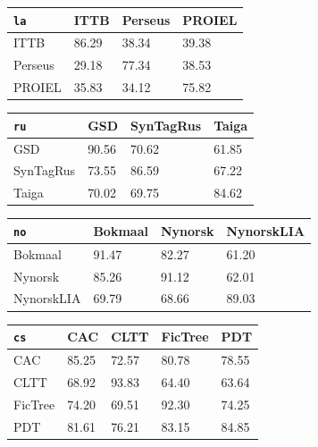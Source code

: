 \begin{table}[H]
\begin{tabular}{|l|l|l|l|}
    \hline
    \verb|la| & ITTB & Perseus & PROIEL \\
    \hline
    ITTB & 86.29 & 38.34 & 39.38 \\
    \hline
    Perseus & 29.18 & 77.34 & 38.53 \\
    \hline
    PROIEL & 35.83 & 34.12 & 75.82 \\
    \hline
    \end{tabular}
    \vspace{5mm}
    \newline
    \begin{tabular}{|l|l|l|l|}
    \hline
    \verb|ru| & GSD & SynTagRus & Taiga\\
    \hline
    GSD & 90.56 & 70.62 & 61.85 \\
    \hline
    SynTagRus & 73.55 & 86.59 & 67.22 \\
    \hline
    Taiga & 70.02 & 69.75 & 84.62 \\
    \hline
    \end{tabular}%
    \vspace{5mm}
    \newline
    \begin{tabular}{|l|l|l|l|}
    \hline
    \verb|no| & Bokmaal & Nynorsk & NynorskLIA \\
    \hline
    Bokmaal & 91.47 & 82.27 & 61.20 \\
    \hline
    Nynorsk & 85.26 & 91.12 & 62.01 \\
    \hline
    NynorskLIA & 69.79 & 68.66 & 89.03 \\
    \hline
    \end{tabular}%
    \vspace{5mm}
    \newline
    \begin{tabular}{|l|l|l|l|l|}
    \hline
    \verb|cs| & CAC & CLTT & FicTree & PDT \\
    \hline
    CAC & 85.25 & 72.57 & 80.78 & 78.55 \\
    \hline
    CLTT & 68.92 & 93.83 & 64.40 & 63.64 \\
    \hline
    FicTree & 74.20 & 69.51 & 92.30 & 74.25 \\
    \hline
    PDT & 81.61 & 76.21 & 83.15 & 84.85 \\
    \hline 
    \end{tabular}%
    \vspace{5mm}
    \newline

\end{table}

